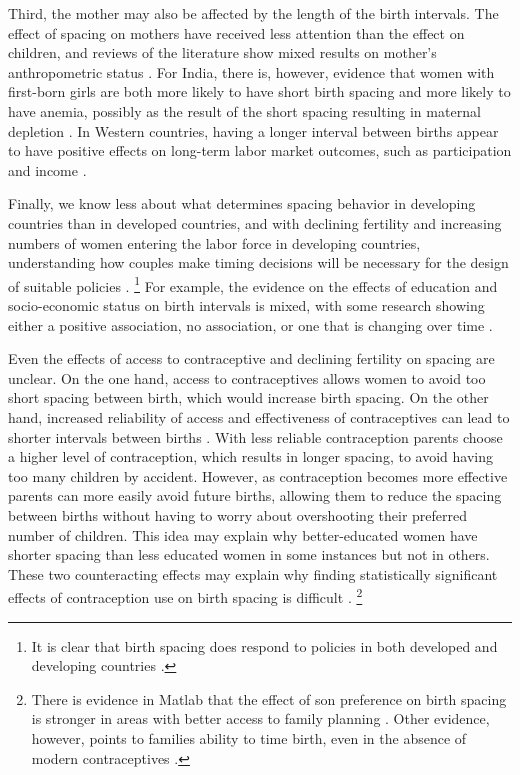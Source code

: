 \documentclass[12pt,letterpaper]{article}
\begin{document}
Third, the mother may also be affected by the length of the birth intervals.
The effect of spacing on mothers have received less attention than the effect on children, 
and reviews of the literature show mixed results on mother's anthropometric status 
\citep{Dewey2007,Conde-Agudelo2012}.
For India, there is, however, evidence that women with first-born girls are both
more likely to have short birth spacing and more likely to have anemia, possibly as
the result of the short spacing resulting in maternal depletion \citep{Milazzo2018}.
In Western countries, having a longer interval between births appear to have positive
effects on long-term labor market outcomes, such as participation and 
income \citep{Gough2017,Karimi2014}.

Finally, we know less about what determines spacing behavior in developing countries than 
in developed countries, and with declining fertility and increasing numbers of women 
entering the labor force in developing countries, understanding how couples make timing 
decisions will be necessary for the design of suitable policies \citep{Portner2018}.%
\footnote{
It is clear that birth spacing does respond to policies in both developed and 
developing countries \citep{Pettersson-Lidbom2009,Todd2012,Meckel2015,Ghosh2018}.
}
For example, the evidence on the effects of education and socio-economic status on
birth intervals is mixed, with some research showing either a positive association, no
association, or one that is changing over time 
\citep{Tulasidhar1993,Whitworth2002,Bhalotra2008,Kim2010,Soest2018}.

Even the effects of access to contraceptive and declining fertility on spacing are unclear.
On the one hand, access to contraceptives allows women to avoid too short spacing between 
birth, which would increase birth spacing.
On the other hand, increased reliability of access and effectiveness of contraceptives can 
lead to shorter intervals between births  \citep{Keyfitz1971,Heckman1976}.
With less reliable contraception parents choose a higher level of contraception, which 
results in longer spacing, to avoid having too many children by accident.
However, as contraception becomes more effective parents can more easily avoid future 
births, allowing them to reduce the spacing between births without having to worry about 
overshooting their preferred number of children.
This idea may explain why better-educated women have shorter spacing than less educated 
women in some instances but not in others.
These two counteracting effects may explain why finding statistically significant effects 
of contraception use on birth spacing is difficult \citep{Yeakey2009}.%
\footnote{
There is evidence in Matlab that the effect of son preference on birth spacing is
stronger in areas with better access to family planning \citep{Rahman1993}.
Other evidence, however, points to families ability to time birth, even in the absence
of modern contraceptives \citep{Jayachandran2011,Alam2018}.
}
\end{document}
